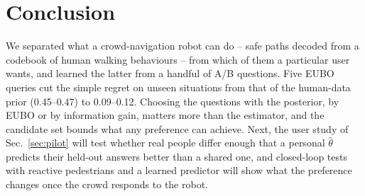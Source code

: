 \section{Conclusion}
\label{sec:conclusion}
We separated what a crowd-navigation robot can do -- safe paths decoded from a codebook of human walking behaviours -- from which of them a
particular user wants, and learned the latter from a handful of A/B questions. Five EUBO queries cut the simple regret on unseen situations
from that of the human-data prior (0.45--0.47) to 0.09--0.12. Choosing the questions with the posterior, by EUBO or by information gain, matters more than the estimator, and the candidate set bounds
what any preference can achieve. Next, the user study of Sec.~\ref{sec:pilot} will test whether real people differ enough that a
personal $\hat\theta$ predicts their held-out answers better than a shared one, and closed-loop tests with reactive pedestrians and a learned
predictor will show what the preference changes once the crowd responds to the robot.
